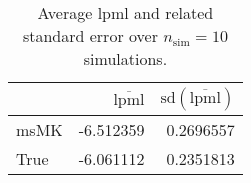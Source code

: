 \begin{table}[H]

\caption{Average lpml and related standard error over $n_{\text{sim}} = 10$ simulations.}
\centering
\begin{tabular}[t]{lrr}
\toprule
  & $\overbar{\text{lpml}}$ & $\text{sd}(\overbar{\text{lpml}})$\\
\midrule
msMK & -6.512359 & 0.2696557\\
True & -6.061112 & 0.2351813\\
\bottomrule
\end{tabular}
\end{table}